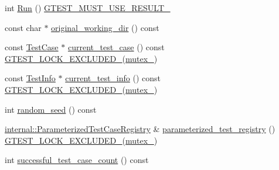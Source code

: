 \begin{DoxyCompactItemize}
\item 
int \mbox{\hyperlink{classtesting_1_1_unit_test_a2febc800536b44500565f4c423f359d3}{Run}} () \mbox{\hyperlink{_obj__test_2lib_2googletest-release-1_88_81_2googletest_2include_2gtest_2internal_2gtest-port_8h_a8e5aab8276b2645f64f41c9e3021b935}{G\+T\+E\+S\+T\+\_\+\+M\+U\+S\+T\+\_\+\+U\+S\+E\+\_\+\+R\+E\+S\+U\+L\+T\+\_\+}}
\item 
const char $\ast$ \mbox{\hyperlink{classtesting_1_1_unit_test_af35839566385e14f6b31232489112621}{original\+\_\+working\+\_\+dir}} () const
\item 
const \mbox{\hyperlink{classtesting_1_1_test_case}{Test\+Case}} $\ast$ \mbox{\hyperlink{classtesting_1_1_unit_test_a158da6213cf0b2c6100e9cb1f8151e63}{current\+\_\+test\+\_\+case}} () const \mbox{\hyperlink{_obj__test_2lib_2googletest-release-1_88_81_2googletest_2include_2gtest_2internal_2gtest-port_8h_a69abff5a4efdd07bd5faebe3dd318d06}{G\+T\+E\+S\+T\+\_\+\+L\+O\+C\+K\+\_\+\+E\+X\+C\+L\+U\+D\+E\+D\+\_\+}}(\mbox{\hyperlink{classtesting_1_1_unit_test_abb94ef45cf0ab43be81ac6d5b1364132}{mutex\+\_\+}})
\item 
const \mbox{\hyperlink{classtesting_1_1_test_info}{Test\+Info}} $\ast$ \mbox{\hyperlink{classtesting_1_1_unit_test_a02b6ab72bb9d93805bd0efbb099b4ccc}{current\+\_\+test\+\_\+info}} () const \mbox{\hyperlink{_obj__test_2lib_2googletest-release-1_88_81_2googletest_2include_2gtest_2internal_2gtest-port_8h_a69abff5a4efdd07bd5faebe3dd318d06}{G\+T\+E\+S\+T\+\_\+\+L\+O\+C\+K\+\_\+\+E\+X\+C\+L\+U\+D\+E\+D\+\_\+}}(\mbox{\hyperlink{classtesting_1_1_unit_test_abb94ef45cf0ab43be81ac6d5b1364132}{mutex\+\_\+}})
\item 
int \mbox{\hyperlink{classtesting_1_1_unit_test_adddc090a06f2d3a0e68f3762ee262688}{random\+\_\+seed}} () const
\item 
\mbox{\hyperlink{classtesting_1_1internal_1_1_parameterized_test_case_registry}{internal\+::\+Parameterized\+Test\+Case\+Registry}} \& \mbox{\hyperlink{classtesting_1_1_unit_test_a1d9bd4ed86901c44b525a7b6ca4cbf3b}{parameterized\+\_\+test\+\_\+registry}} () \mbox{\hyperlink{_obj__test_2lib_2googletest-release-1_88_81_2googletest_2include_2gtest_2internal_2gtest-port_8h_a69abff5a4efdd07bd5faebe3dd318d06}{G\+T\+E\+S\+T\+\_\+\+L\+O\+C\+K\+\_\+\+E\+X\+C\+L\+U\+D\+E\+D\+\_\+}}(\mbox{\hyperlink{classtesting_1_1_unit_test_abb94ef45cf0ab43be81ac6d5b1364132}{mutex\+\_\+}})
\item 
int \mbox{\hyperlink{classtesting_1_1_unit_test_acaa2ab71f53c25ffe0242a91c14e173f}{successful\+\_\+test\+\_\+case\+\_\+count}} () const

\end{DoxyCompactItemize}
